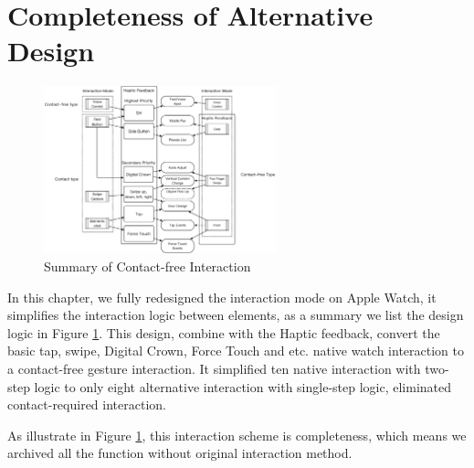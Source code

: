 \section{Completeness of Alternative Design}
\label{sec:completeness}

\begin{figure}[H]
    \kaishu
    \centering
    \includegraphics[width=0.6\textwidth]{figures/interaction-en}
    \caption{\kaishu Summary of Contact-free Interaction}
    \label{fig:interaction}
\end{figure}

In this chapter, we fully redesigned the interaction mode on Apple Watch, it simplifies the interaction logic between elements, as a summary we list the design logic in Figure \ref{fig:interaction}.
This design, combine with the Haptic feedback, convert the basic tap, swipe, Digital Crown, Force Touch and etc. native watch interaction to a contact-free gesture interaction. It simplified ten native interaction with two-step logic to only eight alternative interaction with single-step logic, eliminated contact-required interaction.

As illustrate in Figure \ref{fig:interaction}, this interaction scheme is completeness, which means we archived all the function without original interaction method.

\cleardoublepage

